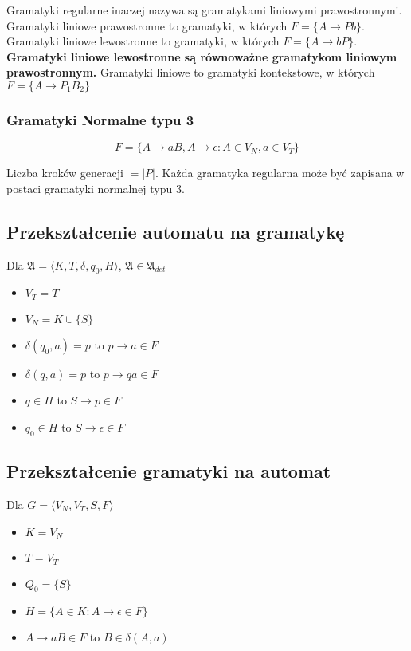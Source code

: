 \documentclass{../notatki}
\begin{document}
Gramatyki regularne inaczej nazywa są gramatykami liniowymi prawostronnymi.
Gramatyki liniowe prawostronne to gramatyki, w których $F = \{A \rightarrow Pb\}$.
Gramatyki liniowe lewostronne to gramatyki, w których $F = \{A \rightarrow bP\}$.
\textbf{Gramatyki liniowe lewostronne są równoważne gramatykom liniowym prawostronnym.}
Gramatyki liniowe to gramatyki kontekstowe, w których $F = \{A \rightarrow P_1B_2\}$

\subsubsection{Gramatyki Normalne typu 3}

$$
F = \{A \rightarrow aB, A \rightarrow \epsilon : A \in V_N, a \in V_T\}
$$

Liczba kroków generacji $= |P|$.
Każda gramatyka regularna może być zapisana w postaci gramatyki normalnej typu 3.

\subsection{Przekształcenie automatu na gramatykę}

Dla $\mathfrak{A} = \langle K,T,\delta,q_0,H \rangle$, $\mathfrak{A} \in \mathfrak{A}_{det}$

\begin{itemize}
    \item $V_T = T$
    \item $V_N = K \cup \{S\}$
    \item $\delta(q_0, a) = p$ to $p \rightarrow a \in F$
    \item $\delta(q, a) = p$ to $p \rightarrow qa \in F$
    \item $q \in H$ to $S \rightarrow p \in F$
    \item $q_0 \in H$ to $S \rightarrow \epsilon \in F$
\end{itemize}

\subsection{Przekształcenie gramatyki na automat}

Dla $G = \langle V_N, V_T, S, F \rangle$

\begin{itemize}
    \item $K = V_N$
    \item $T = V_T$
    \item $Q_0 = \{S\}$
    \item $H = \{A \in K : A \rightarrow \epsilon \in F\}$
    \item $A \rightarrow aB \in F$ to $B \in \delta(A, a)$
\end{itemize}
\end{document}
